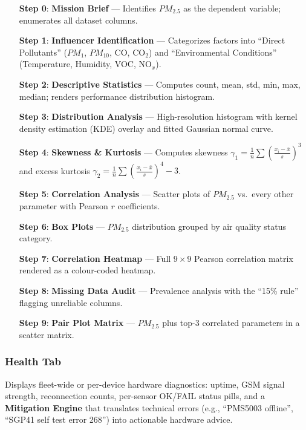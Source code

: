 \figMethodologyEdaFlow

\begin{enumerate}[nosep]
    \item[\textbf{Step 0}:] \textbf{Mission Brief} --- Identifies $PM_{2.5}$ as the dependent variable; enumerates all dataset columns.
    \item[\textbf{Step 1}:] \textbf{Influencer Identification} --- Categorizes factors into ``Direct Pollutants'' ($PM_1$, $PM_{10}$, CO, CO$_2$) and ``Environmental Conditions'' (Temperature, Humidity, VOC, NO$_x$).
    \item[\textbf{Step 2}:] \textbf{Descriptive Statistics} --- Computes count, mean, std, min, max, median; renders performance distribution histogram.
    \item[\textbf{Step 3}:] \textbf{Distribution Analysis} --- High-resolution histogram with kernel density estimation (KDE) overlay and fitted Gaussian normal curve.
    \item[\textbf{Step 4}:] \textbf{Skewness \& Kurtosis} --- Computes skewness $\gamma_1 = \frac{1}{n}\sum\left(\frac{x_i - \bar{x}}{s}\right)^3$ and excess kurtosis $\gamma_2 = \frac{1}{n}\sum\left(\frac{x_i - \bar{x}}{s}\right)^4 - 3$.
    \item[\textbf{Step 5}:] \textbf{Correlation Analysis} --- Scatter plots of $PM_{2.5}$ vs.\ every other parameter with Pearson $r$ coefficients.
    \item[\textbf{Step 6}:] \textbf{Box Plots} --- $PM_{2.5}$ distribution grouped by air quality status category.
    \item[\textbf{Step 7}:] \textbf{Correlation Heatmap} --- Full $9 \times 9$ Pearson correlation matrix rendered as a colour-coded heatmap.
    \item[\textbf{Step 8}:] \textbf{Missing Data Audit} --- Prevalence analysis with the ``15\% rule'' flagging unreliable columns.
    \item[\textbf{Step 9}:] \textbf{Pair Plot Matrix} --- $PM_{2.5}$ plus top-3 correlated parameters in a scatter matrix.
\end{enumerate}

\subsubsection{Health Tab}
Displays fleet-wide or per-device hardware diagnostics: uptime, GSM signal strength, reconnection counts, per-sensor OK/FAIL status pills, and a \textbf{Mitigation Engine} that translates technical errors (e.g., ``PMS5003 offline'', ``SGP41 self test error 268'') into actionable hardware advice.


